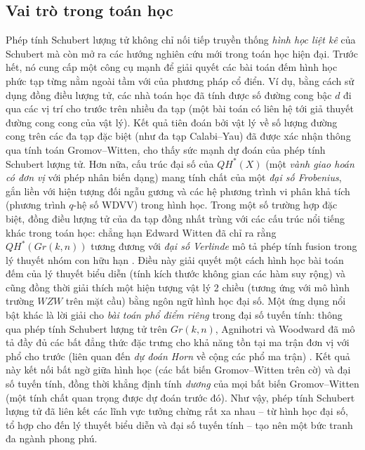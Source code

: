 \subsection{Vai trò trong toán học}
Phép tính Schubert lượng tử không chỉ nối tiếp truyền thống \textit{hình học liệt kê} của Schubert mà còn mở ra các hướng nghiên cứu mới trong toán học hiện đại. Trước hết, nó cung cấp một công cụ mạnh để giải quyết các bài toán đếm hình học phức tạp từng nằm ngoài tầm với của phương pháp cổ điển. Ví dụ, bằng cách sử dụng đồng điều lượng tử, các nhà toán học đã tính được số đường cong bậc $d$ đi qua các vị trí cho trước trên nhiều đa tạp (một bài toán có liên hệ tới giả thuyết đường cong cong của vật lý). Kết quả tiên đoán bởi vật lý về số lượng đường cong trên các đa tạp đặc biệt (như đa tạp Calabi–Yau) đã được xác nhận thông qua tính toán Gromov–Witten, cho thấy sức mạnh dự đoán của phép tính Schubert lượng tử. Hơn nữa, cấu trúc đại số của $QH^*(X)$ (một \textit{vành giao hoán có đơn vị} với phép nhân biến dạng) mang tính chất của một \textit{đại số Frobenius}, gắn liền với hiện tượng đối ngẫu gương và các hệ phương trình vi phân khả tích (phương trình $q$-hệ số WDVV) trong hình học. Trong một số trường hợp đặc biệt, đồng điều lượng tử của đa tạp đồng nhất trùng với các cấu trúc nổi tiếng khác trong toán học: chẳng hạn Edward Witten đã chỉ ra rằng $QH^*(Gr(k,n))$ tương đương với \textit{đại số Verlinde} mô tả phép tính fusion trong lý thuyết nhóm con hữu hạn \cite{witten1993verlindealgebracohomologygrassmannian}. Điều này giải quyết một cách hình học bài toán đếm của lý thuyết biểu diễn (tính kích thước không gian các hàm suy rộng) và cũng đồng thời giải thích một hiện tượng vật lý 2 chiều (tương ứng với mô hình trường $WZW$ trên mặt cầu) bằng ngôn ngữ hình học đại số. Một ứng dụng nổi bật khác là lời giải cho \textit{bài toán phổ điểm riêng} trong đại số tuyến tính: thông qua phép tính Schubert lượng tử trên $Gr(k,n)$, Agnihotri và Woodward đã mô tả đầy đủ các bất đẳng thức đặc trưng cho khả năng tồn tại ma trận đơn vị với phổ cho trước (liên quan đến \textit{dự đoán Horn} về cộng các phổ ma trận) \cite{agnihotri1997eigenvaluesproductsunitarymatrices}. Kết quả này kết nối bất ngờ giữa hình học (các bất biến Gromov–Witten trên cờ) và đại số tuyến tính, đồng thời khẳng định tính \textit{dương} của mọi bất biến Gromov–Witten (một tính chất quan trọng được dự đoán trước đó). Như vậy, phép tính Schubert lượng tử đã liên kết các lĩnh vực tưởng chừng rất xa nhau – từ hình học đại số, tổ hợp cho đến lý thuyết biểu diễn và đại số tuyến tính – tạo nên một bức tranh đa ngành phong phú.

